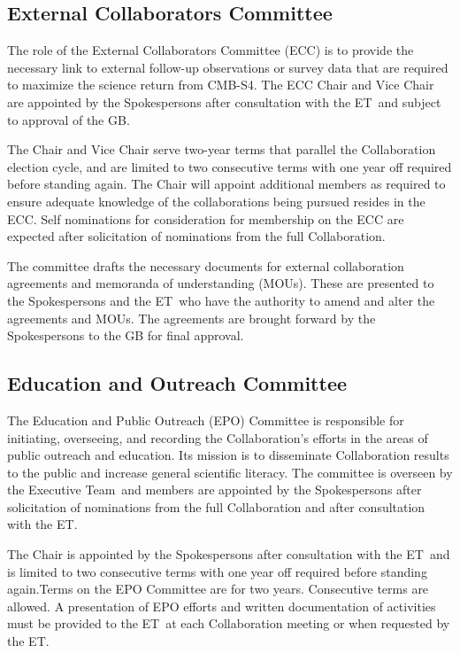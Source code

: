 \documentclass[12pt]{article}
\newcommand{\exec}{{Executive Team}}
\newcommand{\shorte}{{ET}}  %
\newcommand\collabname{CMB-S4}
\begin{document}
\subsection{External Collaborators Committee}

The role of the External Collaborators Committee (ECC) is to provide the necessary link to external follow-up observations or survey data that are required to maximize the science return from \collabname. The ECC Chair and Vice Chair are appointed by the Spokespersons after consultation with the \shorte\ and subject to approval of the GB.  

The Chair and Vice Chair serve two-year terms that parallel the Collaboration election cycle, and are limited to two consecutive terms with one year off required before standing again. The Chair will appoint additional members as required to ensure adequate knowledge of the collaborations being pursued resides in the ECC. Self nominations for consideration for membership on the ECC are expected after solicitation of nominations from the full Collaboration.  

The committee drafts the necessary documents for external collaboration agreements and memoranda of understanding (MOUs). These are presented to the Spokespersons and the \shorte\ who have the authority to amend and alter the agreements and MOUs. The agreements are brought forward by the Spokespersons to the GB for final approval.

\subsection{Education and Outreach Committee}

The Education and Public Outreach (EPO) Committee is responsible for initiating, overseeing, and recording the Collaboration's efforts in the areas of public outreach and education. Its mission is to disseminate Collaboration results to the public and increase general scientific literacy. The committee is overseen by the \exec \ and members are appointed by the Spokespersons after solicitation of nominations from the full Collaboration and after consultation with the \shorte.

The Chair is appointed by the Spokespersons after consultation with the \shorte\  and is limited to two consecutive terms with one year off required before standing again.Terms on the EPO Committee are for two years. Consecutive terms are allowed.  A presentation of EPO efforts and written documentation of activities must be provided to the \shorte\ at each Collaboration meeting or when requested by the \shorte.   
\end{document}
